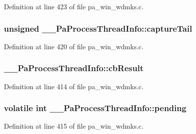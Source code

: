 Definition at line 423 of file pa\+\_\+win\+\_\+wdmks.\+c.

\subsubsection[{\texorpdfstring{capture\+Tail}{captureTail}}]{\setlength{\rightskip}{0pt plus 5cm}unsigned \+\_\+\+\_\+\+Pa\+Process\+Thread\+Info\+::capture\+Tail}\hypertarget{struct_____pa_process_thread_info_a0176c49820b2df61da28580d9702f64f}{}\label{struct_____pa_process_thread_info_a0176c49820b2df61da28580d9702f64f}


Definition at line 420 of file pa\+\_\+win\+\_\+wdmks.\+c.

\subsubsection[{\texorpdfstring{cb\+Result}{cbResult}}]{ \+\_\+\+\_\+\+Pa\+Process\+Thread\+Info\+::cb\+Result}\hypertarget{struct_____pa_process_thread_info_aff68ee41ea10c48f0a7a59b1b914fb6b}{}\label{struct_____pa_process_thread_info_aff68ee41ea10c48f0a7a59b1b914fb6b}


Definition at line 414 of file pa\+\_\+win\+\_\+wdmks.\+c.

\subsubsection[{\texorpdfstring{pending}{pending}}]{\setlength{\rightskip}{0pt plus 5cm}volatile {\bf int} \+\_\+\+\_\+\+Pa\+Process\+Thread\+Info\+::pending}\hypertarget{struct_____pa_process_thread_info_aa45f4971b33af9b928d1b158e0e508a2}{}\label{struct_____pa_process_thread_info_aa45f4971b33af9b928d1b158e0e508a2}


Definition at line 415 of file pa\+\_\+win\+\_\+wdmks.\+c.

